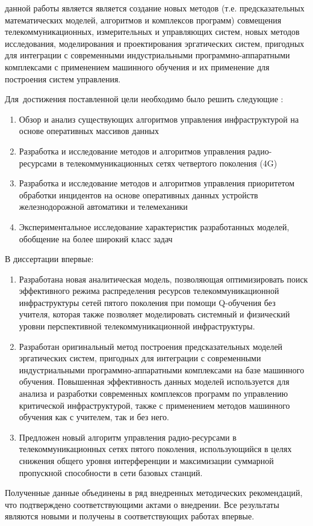 
{\aim} данной работы является является создание новых методов (т.е. предсказательных математических моделей, алгоритмов и комплексов программ) совмещения телекоммуникационных, измерительных и управляющих систем, новых методов исследования, моделирования и проектирования эргатических систем, пригодных для интеграции с современными индустриальными программно-аппаратными комплексами с применением машинного обучения и их применение для построения систем управления.


Для~достижения поставленной цели необходимо было решить следующие {\tasks}:
\begin{enumerate}
  \item Обзор и анализ существующих алгоритмов управления инфраструктурой на основе оперативных массивов данных
  \item Разработка и исследование методов и алгоритмов управления радио-ресурсами в телекоммуникационных сетях четвертого поколения (4G)
  \item Разработка и исследование методов и алгоритмов управления приоритетом обработки инцидентов на основе оперативных данных устройств железнодорожной автоматики и телемеханики
  \item Экспериментальное исследование характеристик разработанных моделей, обобщение на более широкий класс задач

\end{enumerate}

{\novelty}
В диссертации впервые:
\begin{enumerate}
\item Разработана новая аналитическая модель, позволяющая оптимизировать поиск эффективного режима распределения ресурсов телекоммуникационной инфраструктуры сетей пятого поколения при помощи Q-обучения без учителя, которая также позволяет моделировать системный и физический уровни перспективной телекоммуникационной инфраструктуры.
\item Разработан оригинальный метод построения предсказательных моделей эргатических систем, пригодных для интеграции с современными индустриальными программно-аппаратными комплексами на базе машинного обучения. Повышенная эффективность данных моделей используется для анализа и разработки современных комплексов программ по управлению критической инфраструктурой, также с применением методов машинного обучения как с учителем, так и без него.
\item Предложен новый алгоритм управления радио-ресурсами в телекоммуникационных сетях пятого поколения, использующийся в целях снижения общего уровня интерференции и максимизации суммарной пропускной способности в сети базовых станций.
\end{enumerate}
Полученные данные объединены в ряд внедренных методических рекомендаций, что подтверждено соответствующими актами о внедрении.
Все результаты являются новыми и получены в соответствующих работах впервые.

